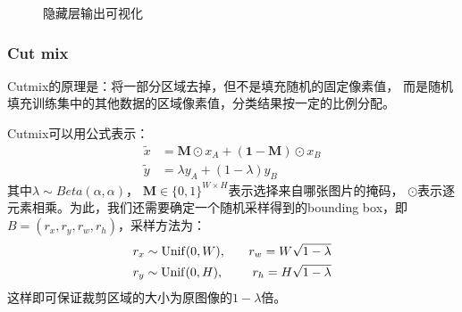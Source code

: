 \documentclass[UTF8]{ctexart}
\begin{document}
\begin{figure}[h]
    \centering
    \hspace{0.5in}
    \hspace{0.5in}
    \hspace{0.5in}
    \hspace{0.5in}
    \hspace{0.5in}
    \caption{隐藏层输出可视化}
\end{figure}

\subsubsection{Cut mix}
Cutmix的原理是：将一部分区域去掉，但不是填充随机的固定像素值，
而是随机填充训练集中的其他数据的区域像素值，分类结果按一定的比例分配。

Cutmix可以用公式表示：
$$\begin{aligned}
    \tilde{x} &= \textbf{M} \odot x_A + (\textbf{1}-\textbf{M}) \odot x_B \\
    \tilde{y} &= \lambda y_A + (1-\lambda) y_B
\end{aligned}$$
其中$\lambda\sim Beta(\alpha, \alpha)$，
$\textbf{M}\in\{0,1\}^{W\times H}$表示选择来自哪张图片的掩码，
$\odot$表示逐元素相乘。为此，我们还需要确定一个随机采样得到的bounding box，即
$B=(r_x,r_y,r_w,r_h)$，采样方法为：
$$\begin{aligned}
    & r_x \sim {\rm Unif}(0, W), & \quad r_w=W\sqrt{1-\lambda} \\
    & r_y \sim {\rm Unif}(0, H), & \quad r_h=H\sqrt{1-\lambda}
\end{aligned}$$
这样即可保证裁剪区域的大小为原图像的$1-\lambda$倍。
\end{document}
